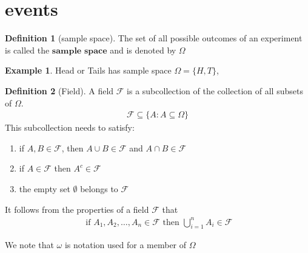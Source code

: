 \documentclass[12pt]{article}
\theoremstyle{definition}%
\newtheorem{definition}{Definition}[section]
\newtheorem{example}[theorem]{Example}
\begin{document}
\section{events}
\begin{definition}[sample space]
	The set of all possible outcomes of an experiment is called the $\textbf{sample space}$ and is denoted by $\Omega$

\end{definition}


\begin{example}
	Head or Tails has sample space $\Omega = \{H, T\}$,

	
\end{example}

\begin{definition}[Field]
	A field $\mathcal{F}$ is a subcollection of the collection of all subsets of $\Omega$. 
	\begin{align*}
		\mathcal{F} \subseteq \{A \colon A \subseteq \Omega\}
	\end{align*}
	This subcollection needs to satisfy:
	\begin{enumerate}
		\item 	if $A, B \in \mathcal{F}$, then $A \cup B \in \mathcal{F}$ and $A \cap B \in \mathcal{F}$

		\item if $A \in \mathcal{F}$ then $A^c \in \mathcal{F}$
		\item the empty set $\emptyset$ belongs to $\mathcal{F}$
	\end{enumerate}
	It follows from the properties of a field $\mathcal{F}$ that
	\begin{align*}
		\text{ if } A_1,A_2,\ldots, A_n \in \mathcal{F} \text{ then } \bigcup_{i = 1}^{n}A_i \in \mathcal{F}
	\end{align*}
\end{definition}
We note that $\omega$ is notation used for a member of $\Omega$
\end{document}
